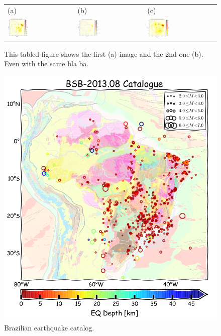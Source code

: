 \documentclass[draft, grl]{agutex}
\begin{document}
\begin{figure}
	\begin{center}
	\begin{table}[H]
		\begin{tabular}{ p{} 
						 p{} 
						 p{} }
		\footnotesize(a) &
		\footnotesize(b) &
		\footnotesize(c)
		\\				
		\includegraphics[width=0.33\textwidth]{z_img_pga_frankel} &
		\includegraphics[width=0.33\textwidth]{z_img_pga_woo} &
		\includegraphics[width=0.33\textwidth]{z_img_pga_helmstetter}
		\end{tabular}
	\end{table}
	\caption{This tabled figure shows the first (a) image and the 2nd one (b). Even with the same bla ba.}
	\label{placeholder2}
	\end{center}
\end{figure}


\begin{figure}
	\includegraphics[width=0.4\linewidth]{z_img_seismicity_br}
	\caption{Brazilian earthquake catalog.}
	\label{fig_seismicity}
\end{figure}
\end{document}

